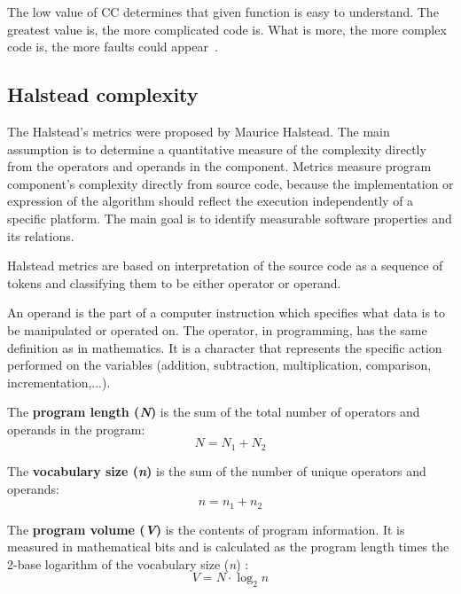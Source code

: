 The low value of \ac{CC} determines that given function is easy to understand. The greatest value is, the more complicated code is. What is more, the more complex code is, the more faults could appear~\cite{alain}.

\subsection{Halstead complexity}
\label{sec:halstead}

The Halstead's metrics were proposed by Maurice Halstead. The main assumption is to determine a quantitative measure of the complexity directly from the operators and operands in the component. Metrics measure program component's complexity directly from source code, because the implementation or expression of the algorithm should reflect the execution independently of a specific platform. The main goal is to identify measurable software properties and its relations.

Halstead metrics are based on interpretation of the source code as a sequence of tokens and classifying them to be either operator or operand.   

An operand is the part of a computer instruction which specifies what data is to be manipulated or operated on. The operator, in programming, has the same definition as in mathematics. It is a character that represents the specific action performed on the variables (addition, subtraction, multiplication, comparison, incrementation,...). 

The \textbf{program length (\textit{N})} is the sum of the total number of operators and operands in the program:
\begin{equation}
N={ N }_{ 1 }+{ N }_{ 2 }
\end{equation}

The \textbf{vocabulary size (\textit{n})} is the sum of the number of unique operators and operands:
\begin{equation}
n={ n }_{ 1 }+{ n }_{ 2 }
\end{equation}

The \textbf{program volume (\textit{V})} is the contents of program information. It is measured in mathematical bits and is calculated as the program length times the 2-base logarithm of the vocabulary size (\textit{n}) :
\begin{equation}
V=N\cdot \log _{ 2 }{ n } 
\end{equation}

